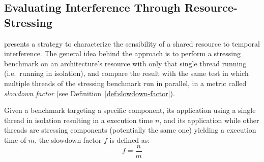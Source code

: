 \stopallthesefloats
\subsection{Evaluating Interference Through Resource-Stressing}
\label{sec:radojkovic}
\cite{10.1145/2086696.2086713} presents a strategy to characterize the
sensibility of a shared resource to temporal interference. The general idea
behind the approach is to perform a stressing benchmark on an architecture's
resource with only that single thread running (i.e.~running in isolation), and
compare the result with the same test in which multiple threads of the stressing
benchmark run in parallel, in a metric called \textit{slowdown factor} (see
Definition~\ref{def:slowdown-factor}).

\begin{definition}
\label{def:slowdown-factor}
Given a benchmark targeting a specific component, its application using a single
thread in isolation resulting in a execution time $n$, and its application while other
threads are stressing components (potentially the same one) yielding a execution time
of $m$, the slowdown factor $f$ is defined as:
\[f = \frac{n}{m}\]
\end{definition}

